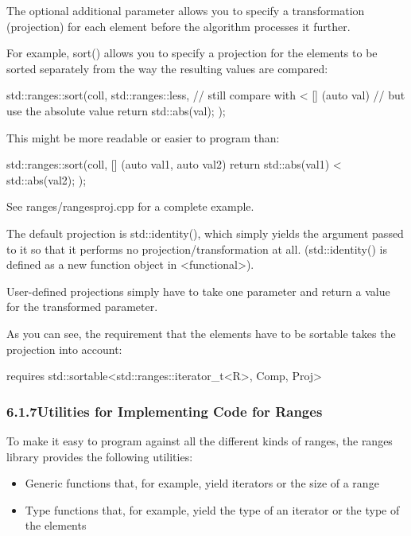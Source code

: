 The optional additional parameter allows you to specify a transformation (projection) for each element before the algorithm processes it further.

For example, sort() allows you to specify a projection for the elements to be sorted separately from the way the resulting values are compared:

\begin{cpp}
std::ranges::sort(coll,
				std::ranges::less{}, // still compare with <
				[] (auto val) { // but use the absolute value
					return std::abs(val);
				});
\end{cpp}

This might be more readable or easier to program than:

\begin{cpp}
std::ranges::sort(coll,
				[] (auto val1, auto val2) {
					return std::abs(val1) < std::abs(val2);
				});
\end{cpp}

See ranges/rangesproj.cpp for a complete example.

The default projection is std::identity(), which simply yields the argument passed to it so that it performs no projection/transformation at all. (std::identity() is defined as a new function object in <functional>).

User-defined projections simply have to take one parameter and return a value for the transformed parameter.

As you can see, the requirement that the elements have to be sortable takes the projection into account:

\begin{cpp}
requires std::sortable<std::ranges::iterator_t<R>, Comp, Proj>
\end{cpp}


\subsubsection*{ 6.1.7\hspace{0.2cm}Utilities for Implementing Code for Ranges}

To make it easy to program against all the different kinds of ranges, the ranges library provides the following utilities:

\begin{itemize}
\item
Generic functions that, for example, yield iterators or the size of a range

\item
Type functions that, for example, yield the type of an iterator or the type of the elements
\end{itemize}

